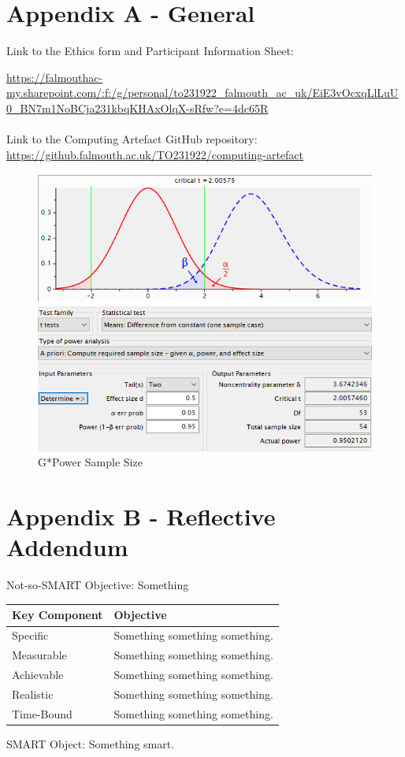 \section*{Appendix A - General} \label{append:a}
Link to the Ethics form and Participant Information Sheet:

\url{https://falmouthac-my.sharepoint.com/:f:/g/personal/to231922_falmouth_ac_uk/EiE3vOcxqLlLuU0_BN7m1NoBCja231kbqKHAxOlqX-sRfw?e=4dc65R}
\\
\\
Link to the Computing Artefact GitHub repository: 
\url{https://github.falmouth.ac.uk/TO231922/computing-artefact}
\begin{figure}[ht]
    \includegraphics[width=\columnwidth]{./Images/gpower.png}
    \centering
    \caption{G*Power Sample Size}
    \label{gpower}
\end{figure}

\newpage
\section*{Appendix B - Reflective Addendum} \label{append:b}
Not-so-SMART Objective: Something
\\
\begin{tabular}{| p{} | p{} |}
    \hline
    \textbf{Key Component} & \textbf{Objective} \\
    \hline
    Specific & Something something something.\\
    \hline
    Measurable & Something something something.\\
    \hline
    Achievable &Something something something.\\
    \hline
    Realistic & Something something something.\\
    \hline
    Time-Bound & Something something something.\\
    \hline
\end{tabular}
SMART Object: Something smart.

